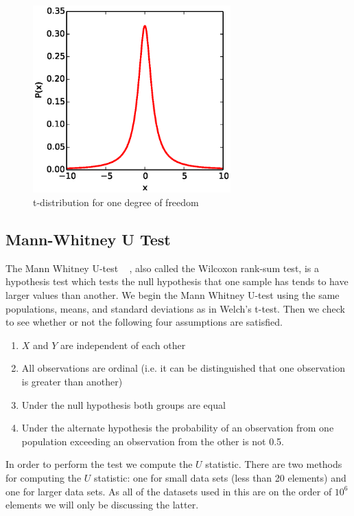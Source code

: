 \begin{figure}\label{TDist}
	  \centering
	  \includegraphics[width=3in]{figures/T_distribution_1df.eps}
	  \caption{t-distribution for one degree of freedom}
\end{figure}





\subsection{Mann-Whitney U Test}\label{sec:mannWhitney}

The Mann Whitney U-test ~\cite{wackerly_mathematical_2007} , also called the Wilcoxon rank-sum test, is a hypothesis test which tests the null hypothesis that one sample has tends to have larger values than another. We begin the Mann Whitney U-test using the same populations, means, and standard deviations as in Welch's t-test. Then we check to see whether or not the following four assumptions are satisfied. 

\begin{enumerate}
	\item $X$ and $Y$ are independent of each other
	\item All observations are ordinal (i.e. it can be distinguished that one observation is greater than another) 
	\item Under the null hypothesis both groups are equal
	\item Under the alternate hypothesis the probability of an observation from one population exceeding an observation from the other is not 0.5. 
\end{enumerate}

In order to perform the test we compute the $U$ statistic.  There are two methods for computing the $U$ statistic: one for small data sets (less than 20 elements) and one for larger data sets.  As all of the datasets used in this are on the order of $10^6$ elements we will only be discussing the latter.

